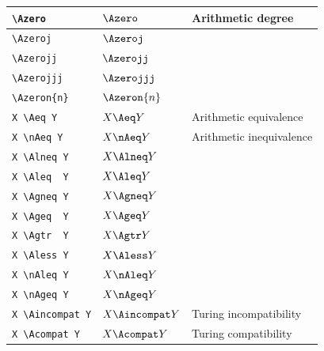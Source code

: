 \documentclass[leqno,11pt]{amsart}
\begin{document}
\begin{xtabular}{l |  l | l}
  \verb=\Azero=                                          & \( 	\Azero                                	   \)   & Arithmetic degree \\ \midrule
  \verb=\Azeroj=                                          & \( 	\Azeroj                                	   \)   & \\ \midrule
	\verb=\Azerojj=                                         & \( 	\Azerojj                               	   \)   & \\ \midrule
	\verb=\Azerojjj=                                         & \( 	\Azerojjj                               	   \)   & \\ \midrule
	\verb=\Azeron{n}=                                       & \( 	\Azeron{n}                             	   \)   & \\ \midrule
  \verb=X \Aeq Y=                                     	 & \( 	X \Aeq Y                           	   \)				& Arithmetic equivalence \\ \midrule
	\verb=X \nAeq Y=                                    	 & \( 	X \nAeq Y                          	   \)   		& Arithmetic inequivalence \\ \midrule
  \verb=X \Alneq Y=                               			& \(  X \Alneq Y   \)   & \\ \midrule
  \verb=X \Aleq  Y=                               			& \(  X \Aleq  Y   \)   & \\ \midrule
  \verb=X \Agneq Y=                               			& \(  X \Agneq Y   \)   & \\ \midrule
  \verb=X \Ageq  Y=                               			& \(  X \Ageq  Y   \)   & \\ \midrule
  \verb=X \Agtr  Y=                               			& \(  X \Agtr  Y   \)   & \\ \midrule
  \verb=X \Aless Y=                               			& \(  X \Aless Y   \)   & \\ \midrule
  \verb=X \nAleq Y=                               			& \(  X \nAleq Y   \)   & \\ \midrule
  \verb=X \nAgeq Y=                               			& \(  X \nAgeq Y   \)   & \\ \midrule
  \verb=X \Aincompat Y=                                   & \(  X \Aincompat Y   \) & Turing incompatibility \\ \midrule 
  \verb=X \Acompat Y=                               		&  \(  X \Acompat Y \)  &  Turing compatibility  \\ \midrule

		\bottomrule
	\end{xtabular}          \\
\makeatletter
\end{document}

